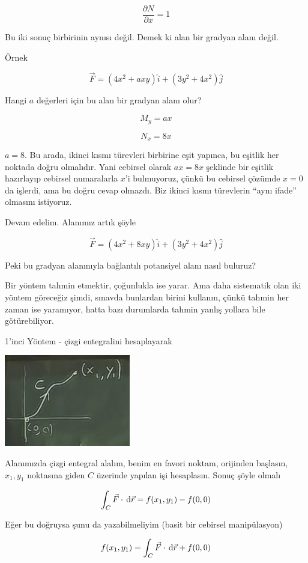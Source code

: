 \documentclass[12pt,fleqn]{article}\usepackage{../../common}
\begin{document}
$$ \frac{\partial N}{\partial x} = 1 $$

Bu iki sonuç birbirinin aynısı değil. Demek ki alan bir gradyan alanı
değil. 

Örnek

$$ \vec{F} = (4x^2 + axy)\hat{i} + (3y^2 + 4x^2)\hat{j} $$

Hangi $a$ değerleri için bu alan bir gradyan alanı olur? 

$$ M_y = ax $$

$$ N_x = 8x $$

$a=8$. Bu arada, ikinci kısmı türevleri birbirine eşit yapınca, bu eşitlik her
noktada doğru olmalıdır. Yani cebirsel olarak $ax = 8x$ şeklinde bir eşitlik
hazırlayıp cebirsel numaralarla $x$'i bulmuyoruz, çünkü bu cebirsel çözümde
$x=0$ da işlerdi, ama bu doğru cevap olmazdı. Biz ikinci kısmı türevlerin ``aynı
ifade'' olmasını istiyoruz.

Devam edelim. Alanımız artık şöyle

$$ \vec{F} = (4x^2 + 8xy)\hat{i} + (3y^2 + 4x^2)\hat{j} $$

Peki bu gradyan alanınıyla bağlantılı potansiyel alanı nasıl buluruz? 

Bir yöntem tahmin etmektir, çoğunlukla ise yarar. Ama daha sistematik olan iki
yöntem göreceğiz şimdi, sınavda bunlardan birini kullanın, çünkü tahmin her
zaman ise yaramıyor, hatta bazı durumlarda tahmin yanlış yollara bile
götürebiliyor.

1'inci Yöntem - çizgi entegralini hesaplayarak 

\includegraphics[height=4cm]{21_2.png}

Alanımızda çizgi entegral alalım, benim en favori noktam, orijinden başlasın,
$x_1,y_1$ noktasına giden $C$ üzerinde yapılan işi hesaplasın.  Sonuç şöyle
olmalı

$$ \int_C \vec{F} \cdot \,\mathrm{d}\vec{r} = 
f(x_1,y_1) - f(0,0)
$$

Eğer bu doğruysa şunu da yazabilmeliyim (basit bir cebirsel manipülasyon)

$$ f(x_1,y_1) = \int_C \vec{F} \cdot \,\mathrm{d}\vec{r} + f(0,0) $$
\end{document}
